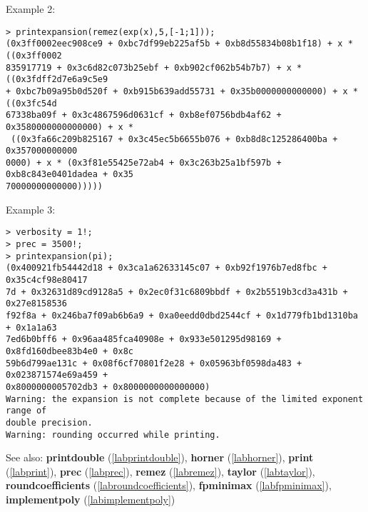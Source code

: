 \noindent Example 2: 
\begin{center}\begin{minipage}{15cm}\begin{Verbatim}[frame=single]
> printexpansion(remez(exp(x),5,[-1;1]));
(0x3ff0002eec908ce9 + 0xbc7df99eb225af5b + 0xb8d55834b08b1f18) + x * ((0x3ff0002
835917719 + 0x3c6d82c073b25ebf + 0xb902cf062b54b7b7) + x * ((0x3fdff2d7e6a9c5e9 
+ 0xbc7b09a95b0d520f + 0xb915b639add55731 + 0x35b0000000000000) + x * ((0x3fc54d
67338ba09f + 0x3c4867596d0631cf + 0xb8ef0756bdb4af62 + 0x3580000000000000) + x *
 ((0x3fa66c209b825167 + 0x3c45ec5b6655b076 + 0xb8d8c125286400ba + 0x357000000000
0000) + x * (0x3f81e55425e72ab4 + 0x3c263b25a1bf597b + 0xb8c843e0401dadea + 0x35
70000000000000)))))
\end{Verbatim}
\end{minipage}\end{center}
\noindent Example 3: 
\begin{center}\begin{minipage}{15cm}\begin{Verbatim}[frame=single]
> verbosity = 1!;
> prec = 3500!;
> printexpansion(pi);
(0x400921fb54442d18 + 0x3ca1a62633145c07 + 0xb92f1976b7ed8fbc + 0x35c4cf98e80417
7d + 0x32631d89cd9128a5 + 0x2ec0f31c6809bbdf + 0x2b5519b3cd3a431b + 0x27e8158536
f92f8a + 0x246ba7f09ab6b6a9 + 0xa0eedd0dbd2544cf + 0x1d779fb1bd1310ba + 0x1a1a63
7ed6b0bff6 + 0x96aa485fca40908e + 0x933e501295d98169 + 0x8fd160dbee83b4e0 + 0x8c
59b6d799ae131c + 0x08f6cf70801f2e28 + 0x05963bf0598da483 + 0x023871574e69a459 + 
0x8000000005702db3 + 0x8000000000000000)
Warning: the expansion is not complete because of the limited exponent range of 
double precision.
Warning: rounding occurred while printing.
\end{Verbatim}
\end{minipage}\end{center}
See also: \textbf{printdouble} (\ref{labprintdouble}), \textbf{horner} (\ref{labhorner}), \textbf{print} (\ref{labprint}), \textbf{prec} (\ref{labprec}), \textbf{remez} (\ref{labremez}), \textbf{taylor} (\ref{labtaylor}), \textbf{roundcoefficients} (\ref{labroundcoefficients}), \textbf{fpminimax} (\ref{labfpminimax}), \textbf{implementpoly} (\ref{labimplementpoly})
